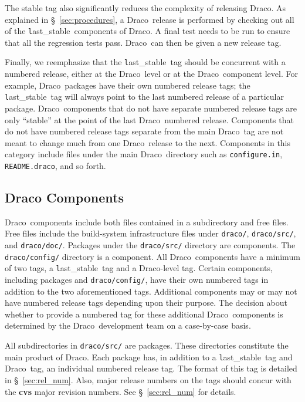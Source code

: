 \documentclass[11pt]{nmemo}
\newcommand{\draco}{{\normalfont\normalsize\textsf Draco}}
\newcommand{\stable}{{\normalfont\normalsize\texttt last\_stable}}
\begin{document}
The stable tag also significantly reduces the complexity of releasing
\draco.  As explained in \S~\ref{sec:procedures}, a \draco\ release is 
performed by checking out all of the \stable\ components of \draco.  A 
final test needs to be run to ensure that all the regression tests
pass.  \draco\ can then be given a new release tag.

Finally, we reemphasize that the \stable\ tag should be concurrent
with a numbered release, either at the \draco\ level or at the \draco\ 
component level.  For example, \draco\ packages have their own
numbered release tags; the \stable\ tag will always point to the last
numbered release of a particular package.  \draco\ components that do
not have separate numbered release tags are only ``stable'' at the
point of the last \draco\ numbered release.  Components that do not
have numbered release tags separate from the main \draco\ tag are not
meant to change much from one \draco\ release to the next.  Components
in this category include files under the main \draco\ directory such
as \texttt{configure.in}, \texttt{README.draco}, and so forth.

\subsection{Draco Components}

\draco\ components include both files contained in a subdirectory and
free files.  Free files include the build-system infrastructure files
under \texttt{draco/}, \texttt{draco/src/}, and \texttt{draco/doc/}.
Packages under the \texttt{draco/src/} directory are components.  The
\texttt{draco/config/} directory is a component.  All \draco\ 
components have a minimum of two tags, a \stable\ tag and a
\draco-level tag.  Certain components, including packages and
\texttt{draco/config/}, have their own numbered tags in addition to
the two aforementioned tags.  Additional components may or may not
have numbered release tags depending upon their purpose.  The decision
about whether to provide a numbered tag for these additional \draco\ 
components is determined by the \draco\ development team on a
case-by-case basis.

All subdirectories in \texttt{draco/src/} are packages.  These
directories constitute the main product of \draco.  Each package has,
in addition to a \stable\ tag and \draco\ tag, an individual numbered
release tag.  The format of this tag is detailed in
\S~\ref{sec:rel_num}.  Also, major release numbers on the tags should
concur with the {\bf cvs} major revision numbers.  See
\S~\ref{sec:rel_num} for details.
\end{document}

